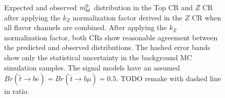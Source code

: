 \begin{figure}
  \centering
  \caption{Expected and observed $m_{b\ell}^0$ distribution in the Top CR and
    $Z$ CR after applying the $k_Z$ normalization factor derived in the $Z$ CR
    when all flavor channels are combined.
    After applying the $k_Z$ normalization factor, both CRs show reasonable
    agreement between the predicted and observed distributions.
    The hashed error bands show only the statistical uncertainty in the
    background MC simulation samples.
    The signal models have an assumed
    $Br(\tilde{t}\rightarrow be) = Br(\tilde{t}\rightarrow b\mu) = 0.5$.
    {\color{red} TODO remake with dashed line in ratio.}
  }
  \label{fig:cr_mbl_0__w_norm_factor}
\end{figure}

